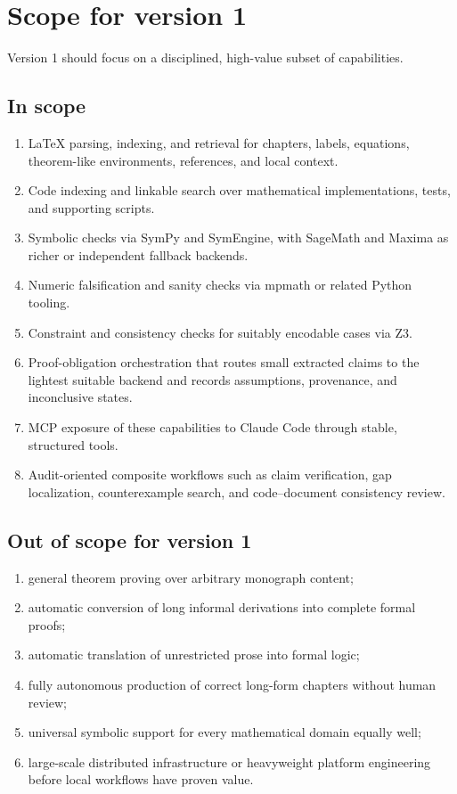 \section{Scope for version 1}

Version 1 should focus on a disciplined, high-value subset of capabilities.

\subsection*{In scope}
\begin{enumerate}[label=\alph*.]
  \item LaTeX parsing, indexing, and retrieval for chapters, labels, equations, theorem-like environments, references, and local context.
  \item Code indexing and linkable search over mathematical implementations, tests, and supporting scripts.
  \item Symbolic checks via SymPy and SymEngine, with SageMath and Maxima as richer or independent fallback backends.
  \item Numeric falsification and sanity checks via mpmath or related Python tooling.
  \item Constraint and consistency checks for suitably encodable cases via Z3.
  \item Proof-obligation orchestration that routes small extracted claims to the lightest suitable backend and records assumptions, provenance, and inconclusive states.
  \item MCP exposure of these capabilities to Claude Code through stable, structured tools.
  \item Audit-oriented composite workflows such as claim verification, gap localization, counterexample search, and code--document consistency review.
\end{enumerate}

\subsection*{Out of scope for version 1}
\begin{enumerate}[label=\alph*.]
  \item general theorem proving over arbitrary monograph content;
  \item automatic conversion of long informal derivations into complete formal proofs;
  \item automatic translation of unrestricted prose into formal logic;
  \item fully autonomous production of correct long-form chapters without human review;
  \item universal symbolic support for every mathematical domain equally well;
  \item large-scale distributed infrastructure or heavyweight platform engineering before local workflows have proven value.
\end{enumerate}

